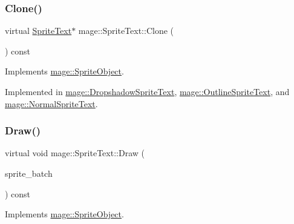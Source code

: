 \hypertarget{classmage_1_1_sprite_text_ac4edf927911a9fb8e5c3a674b217637a}{}\label{classmage_1_1_sprite_text_ac4edf927911a9fb8e5c3a674b217637a} 
\subsubsection{\texorpdfstring{Clone()}{Clone()}}
{\footnotesize\ttfamily virtual \hyperlink{classmage_1_1_sprite_text}{Sprite\+Text}$\ast$ mage\+::\+Sprite\+Text\+::\+Clone (\begin{DoxyParamCaption}{ }\end{DoxyParamCaption}) const\hspace{0.3cm}{\ttfamily [pure virtual]}}



Implements \hyperlink{classmage_1_1_sprite_object_a556c1ffcf4015ba4f8a803974b53ca88}{mage\+::\+Sprite\+Object}.



Implemented in \hyperlink{classmage_1_1_dropshadow_sprite_text_a116c49fb9638414c67a09501c4031a01}{mage\+::\+Dropshadow\+Sprite\+Text}, \hyperlink{classmage_1_1_outline_sprite_text_a095a8ef1603b9045cecb6fd1263243be}{mage\+::\+Outline\+Sprite\+Text}, and \hyperlink{classmage_1_1_normal_sprite_text_aef48e90667849cd9ec01510baf1394cb}{mage\+::\+Normal\+Sprite\+Text}.

\hypertarget{classmage_1_1_sprite_text_a45d5ac8410d5a46b26e8491946a2ad9e}{}\label{classmage_1_1_sprite_text_a45d5ac8410d5a46b26e8491946a2ad9e} 
\subsubsection{\texorpdfstring{Draw()}{Draw()}}
{\footnotesize\ttfamily virtual void mage\+::\+Sprite\+Text\+::\+Draw (\begin{DoxyParamCaption}\item[{Sprite\+Batch \&}]{sprite\+\_\+batch }\end{DoxyParamCaption}) const\hspace{0.3cm}{\ttfamily [pure virtual]}}



Implements \hyperlink{classmage_1_1_sprite_object_a1c1c885fe7846f7ee1cc0b73571c2fa0}{mage\+::\+Sprite\+Object}.



